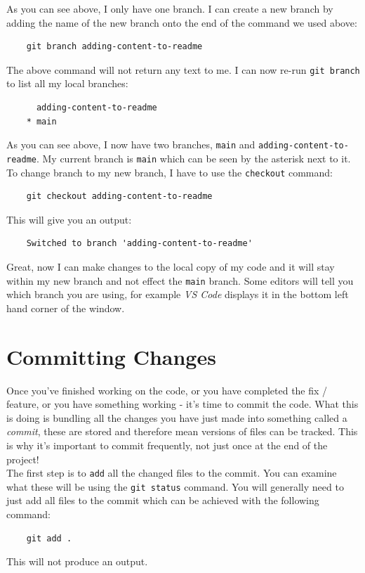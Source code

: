 \documentclass[a4paper, 11pt]{article}
\begin{document}
As you can see above, I only have one branch. I can create a new branch by adding the name of the new branch onto the end of the command we used above:
\begin{verbatim}
    git branch adding-content-to-readme
\end{verbatim}
The above command will not return any text to me. I can now re-run \verb|git branch| to list all my local branches:
\begin{verbatim}
      adding-content-to-readme
    * main
\end{verbatim}
As you can see above, I now have two branches, \verb|main| and \verb|adding-content-to-readme|. My current branch is \verb|main| which can be seen by the asterisk next to it.\\

To change branch to my new branch, I have to use the \verb|checkout| command:
\begin{verbatim}
    git checkout adding-content-to-readme
\end{verbatim}
This will give you an output:
\begin{verbatim}
    Switched to branch 'adding-content-to-readme'
\end{verbatim}

Great, now I can make changes to the local copy of my code and it will stay within my new branch and not effect the \verb|main| branch. Some editors will tell you which branch you are using, for example \textit{VS Code} displays it in the bottom left hand corner of the window.

\section{Committing Changes}
Once you've finished working on the code, or you have completed the fix / feature, or you have something working - it's time to commit the code. What this is doing is bundling all the changes you have just made into something called a \textit{commit}, these are stored and therefore mean versions of files can be tracked. This is why it's important to commit frequently, not just once at the end of the project!\\

The first step is to \verb|add| all the changed files to the commit. You can examine what these will be using the \verb|git status| command. You will generally need to just add all files to the commit which can be achieved with the following command:
\begin{verbatim}
    git add .
\end{verbatim}
This will not produce an output.\\
\end{document}

